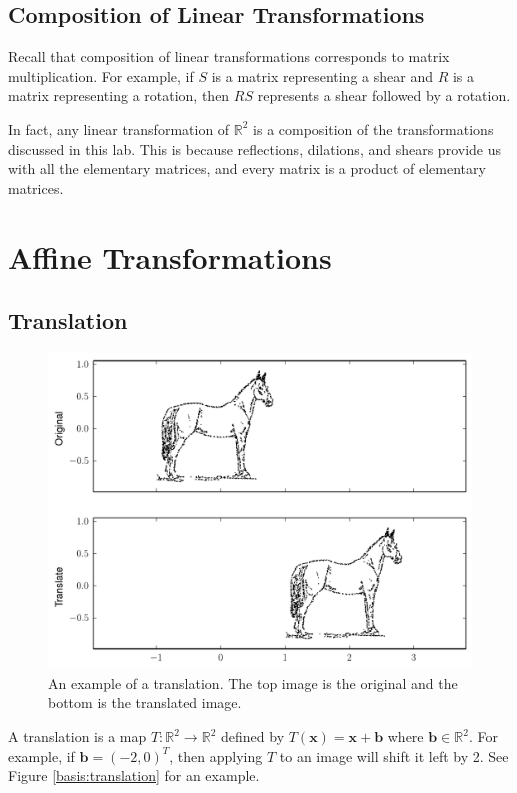 \subsection*{Composition of Linear Transformations}
Recall that composition of linear transformations corresponds to matrix multiplication. For example, if $S$ is a matrix representing a shear and $R$ is a matrix representing a rotation, then $RS$ represents a shear followed by a rotation.

In fact, any linear transformation of $\mathbb{R}^2$ is a composition of the transformations discussed in this lab. This is because reflections, dilations, and shears provide us with all the elementary matrices, and every matrix is a product of elementary matrices. 

\section*{Affine Transformations}
\subsection*{Translation}

\begin{figure}
\includegraphics[width=\textwidth]{translate.pdf}
\caption{
An example of a translation.
The top image is the original and the bottom is the translated image.}
\label{basis:translate}
\end{figure}

A translation is a map $T: \mathbb{R}^2 \rightarrow \mathbb{R}^2$ defined by $T(\mathbf{x}) = \mathbf{x}+\mathbf{b}$ where $\mathbf{b} \in \mathbb{R}^2$. For example, if $\mathbf{b} = (-2, 0)^T$, then applying $T$ to an image will shift it left by 2. See Figure \ref{basis:translation} for an example.


